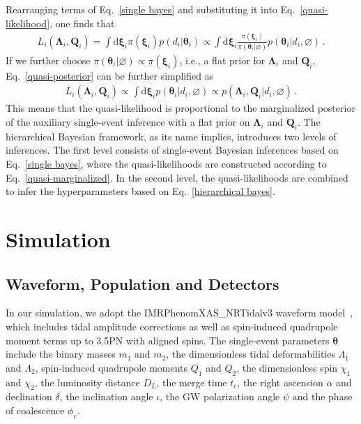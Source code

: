 \documentclass[a4paper,11pt]{article}
\begin{document}
Rearranging terms of Eq.~\eqref{single bayes} and substituting it into
Eq.~\eqref{quasi-likelihood}, one finds that
\begin{equation}
\label{quasi-posterior}
\begin{aligned}
    L_i(\bm{\Lambda}_i,\bm{Q}_i) = \int \text{d}\bm{\xi}_i \pi(\bm{\xi}_i)p(d_i|\bm{\theta}_i) \propto \int \text{d}\bm{\xi}_i \frac{\pi(\bm{\xi}_i)}{\pi(\bm{\theta}_i|\varnothing)}p(\bm{\theta}_i|d_i,\varnothing)\,.
\end{aligned}  
\end{equation}
If we further choose $\pi(\bm{\theta}_i|\varnothing)\propto\pi(\bm{\xi}_i)$, 
i.e., a flat prior for $\bm{\Lambda}_i$ and $\bm{Q}_i$, Eq.~\eqref{quasi-posterior} can be further simplified as 
\begin{equation}
\label{quasi-marginalized}
\begin{aligned}
    L_i(\bm{\Lambda}_i,\bm{Q}_i) \propto \int \text{d}\bm{\xi}_i p(\bm{\theta}_i|d_i,\varnothing)\propto p(\bm{\Lambda}_i,\bm{Q}_i|d_i,\varnothing)\,.
\end{aligned}  
\end{equation}
This means that the quasi-likelihood is proportional to the marginalized
posterior of the auxiliary single-event inference with a flat prior on
$\bm{\Lambda}_i$ and $\bm{Q}_i$. The
hierarchical Bayesian framework, as its name implies, introduces two levels of 
inferences. The first level 
consists of single-event Bayesian inferences based on Eq.~\eqref{single bayes},
where the quasi-likelihoods are constructed according to
Eq.~\eqref{quasi-marginalized}. In the second level, the quasi-likelihoods are
combined to infer the hyperparameters based on Eq.~\eqref{hierarchical bayes}.


\section{Simulation}
\label{sec:simulation}

\subsection{Waveform, Population and Detectors}
\label{subsec:simulation_preliminaries}

In our simulation, we adopt the {\sc IMRPhenomXAS\_NRTidalv3} waveform model~\cite{Abac:2023ujg}, 
which includes tidal amplitude corrections as well as spin-induced quadrupole
moment terms up to 3.5PN with aligned spins.
The single-event parameters $\bm{\theta}$ include 
 the binary masses $m_1$ and $m_2$, the 
dimensionless tidal deformabilities $\Lambda_1$ and $\Lambda_2$, spin-induced 
quadrupole moments $Q_1$ and $Q_2$, the dimensionless spin $\chi_1$ and $\chi_2$, the 
luminosity distance $D_L$, the merge time $t_c$, the right ascension $\alpha$ and 
declination $\delta$, the inclination angle $\iota$, the GW polarization angle 
$\psi$ and the phase of coalescence $\phi_c$.
\end{document}
